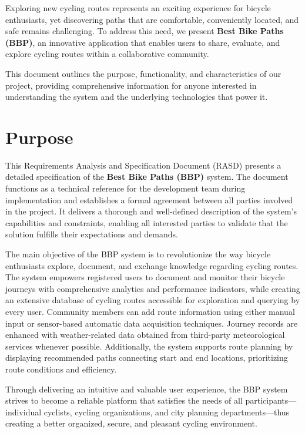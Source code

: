 Exploring new cycling routes represents an exciting experience for bicycle enthusiasts, yet discovering paths that are comfortable, conveniently located, and safe remains challenging. To address this need, we present \textbf{Best Bike Paths (BBP)}, an innovative application that enables users to share, evaluate, and explore cycling routes within a collaborative community.

This document outlines the purpose, functionality, and characteristics of our project, providing comprehensive information for anyone interested in understanding the system and the underlying technologies that power it.

\section{Purpose}
\label{sec:purpose}%
This Requirements Analysis and Specification Document (RASD) presents a detailed specification of the \textbf{Best Bike Paths (BBP)} system. The document functions as a technical reference for the development team during implementation and establishes a formal agreement between all parties involved in the project. It delivers a thorough and well-defined description of the system's capabilities and constraints, enabling all interested parties to validate that the solution fulfills their expectations and demands.

The main objective of the BBP system is to revolutionize the way bicycle enthusiasts explore, document, and exchange knowledge regarding cycling routes. The system empowers registered users to document and monitor their bicycle journeys with comprehensive analytics and performance indicators, while creating an extensive database of cycling routes accessible for exploration and querying by every user. Community members can add route information using either manual input or sensor-based automatic data acquisition techniques. Journey records are enhanced with weather-related data obtained from third-party meteorological services whenever possible. Additionally, the system supports route planning by displaying recommended paths connecting start and end locations, prioritizing route conditions and efficiency.

Through delivering an intuitive and valuable user experience, the BBP system strives to become a reliable platform that satisfies the needs of all participants—individual cyclists, cycling organizations, and city planning departments—thus creating a better organized, secure, and pleasant cycling environment.

